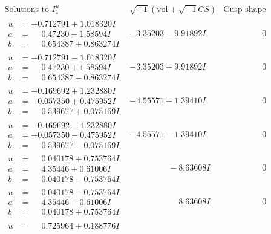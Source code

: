 \documentclass[1p]{elsarticle_modified}
\theoremstyle{definition}
\newcommand{\I}{\sqrt{-1}}
\begin{document}
$$\begin{array}{c|c|c}
\text{Solutions to }I^u_{1}& \I (\text{vol} + \sqrt{-1}CS) & \text{Cusp shape}\\
 \hline 
\begin{aligned}
u &= -0.712791 + 1.018320 I \\
a &= \phantom{-}0.47230 - 1.58594 I \\
b &= \phantom{-}0.654387 + 0.863274 I\end{aligned}
 & -3.35203 - 9.91892 I & \phantom{-0.000000 } 0 \\ \hline\begin{aligned}
u &= -0.712791 - 1.018320 I \\
a &= \phantom{-}0.47230 + 1.58594 I \\
b &= \phantom{-}0.654387 - 0.863274 I\end{aligned}
 & -3.35203 + 9.91892 I & \phantom{-0.000000 } 0 \\ \hline\begin{aligned}
u &= -0.169692 + 1.232880 I \\
a &= -0.057350 + 0.475952 I \\
b &= \phantom{-}0.539677 + 0.075169 I\end{aligned}
 & -4.55571 + 1.39410 I & \phantom{-0.000000 } 0 \\ \hline\begin{aligned}
u &= -0.169692 - 1.232880 I \\
a &= -0.057350 - 0.475952 I \\
b &= \phantom{-}0.539677 - 0.075169 I\end{aligned}
 & -4.55571 - 1.39410 I & \phantom{-0.000000 } 0 \\ \hline\begin{aligned}
u &= \phantom{-}0.040178 + 0.753764 I \\
a &= \phantom{-}4.35446 + 0.61006 I \\
b &= \phantom{-}0.040178 - 0.753764 I\end{aligned}
 & \phantom{-0.000000 } -8.63608 I & \phantom{-0.000000 } 0 \\ \hline\begin{aligned}
u &= \phantom{-}0.040178 - 0.753764 I \\
a &= \phantom{-}4.35446 - 0.61006 I \\
b &= \phantom{-}0.040178 + 0.753764 I\end{aligned}
 & \phantom{-0.000000 -}8.63608 I & \phantom{-0.000000 } 0 \\ \hline\begin{aligned}
u &= \phantom{-}0.725964 + 0.188776 I \\

\end{aligned}
\end{array}$$
\end{document}
